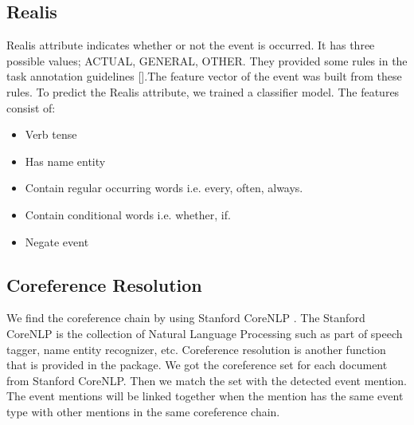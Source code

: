 \documentclass[11pt]{article}
\begin{document}
\subsection{Realis}

Realis attribute indicates whether or not the event is occurred. It has three possible values; ACTUAL, GENERAL, OTHER. They provided some rules in the task annotation guidelines [].The feature vector of the event was built from these rules. To predict the Realis attribute, we trained a classifier model. The features consist of:
\begin{itemize}
\item Verb tense
\item Has name entity
\item Contain regular occurring words i.e. every, often, always.
\item Contain conditional words i.e. whether, if.
\item Negate event
\end{itemize}

\subsection{Coreference Resolution}
We find the coreference chain by using Stanford CoreNLP \cite{Man:14} . The Stanford CoreNLP is the collection of Natural Language Processing such as part of speech tagger, name entity recognizer, etc. Coreference resolution is another function that is provided in the package. We got the coreference set for each document from Stanford CoreNLP. Then we match the set with the detected event mention. The event mentions will be linked together when the mention has the same event type with other mentions in the same coreference chain.
\end{document}
